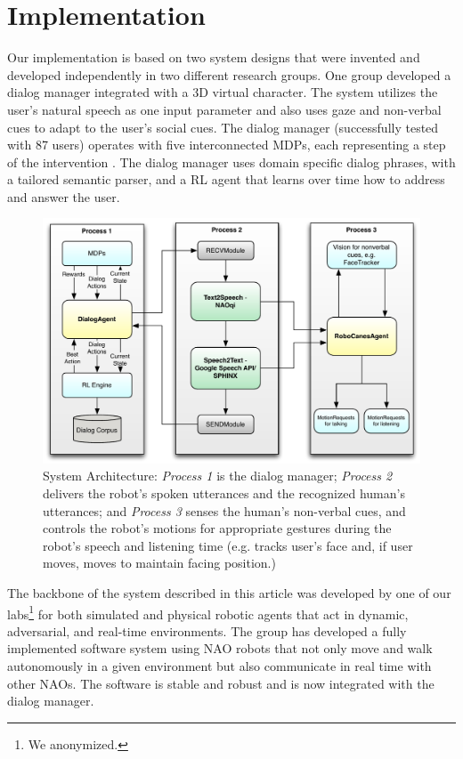 \documentclass[letterpaper]{article}
\begin{document}
\section*{Implementation} 

Our implementation is based on two system designs that were 
invented and developed independently in two different research groups. One  
group developed a dialog manager integrated with a 3D virtual 
character.  The system utilizes the user's natural speech as one input parameter and also uses gaze
and non-verbal cues to adapt to the user's social cues. The dialog manager (successfully 
tested with 87 users) operates with five
interconnected MDPs, each representing a step of the intervention \cite{YASCLL14}. The dialog 
manager uses domain specific dialog phrases, with a tailored semantic parser, and a RL agent that 
learns over time how to address and answer the user. 

\begin{figure}[!t] 
\centering 
\includegraphics[width=.46\textwidth]{figures/system} 
\caption{System Architecture: {\em Process 1} is the dialog manager; {\em Process 2} delivers the 
robot's spoken utterances and the recognized human's utterances; and {\em Process 3} senses the 
human's non-verbal cues, and controls the robot's motions for appropriate gestures during the 
robot's speech and listening time (e.g. tracks user's face and, if user moves, moves to maintain 
facing position.)} 
\label{fig:system} 
\end{figure}

The backbone of the system described in this article was developed by one of our 
labs\footnote{We anonymized.} for both simulated and
physical robotic agents that act in dynamic, adversarial, and real-time environments.    
The group has developed a fully implemented software system  using NAO robots that not 
only move and walk autonomously in a given environment but 
also communicate in real time with other NAOs. The 
software is stable and
robust and is now integrated with the dialog manager.
\end{document}
